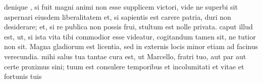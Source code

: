  denique , si fuit magni animi non esse supplicem victori, vide ne superbi sit aspernari eiusdem liberalitatem et, si sapientis est carere patria, duri non desiderare; et, si re publica non possis frui, stultum est nolle privata. caput illud est, ut, si ista vita tibi commodior esse videatur, cogitandum tamen sit, ne tutior non sit. Magna gladiorum est licentia, sed in externis locis minor etiam ad facinus verecundia. mihi salus tua tantae cura est, ut Marcello, fratri tuo, aut par aut certe proximus sini; tuum est consulere temporibus et incolumitati et vitae et fortunis tuis
